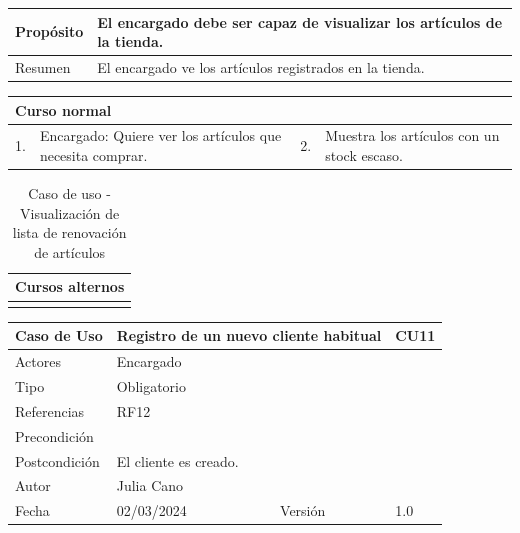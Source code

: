 \begin{table}[H]
	\centering
	\begin{tabular}{| m{} | m{} | m{} | m{} |}
		\hline
		Propósito & \multicolumn{3}{m{0.67\textwidth}|}{El encargado debe ser capaz de visualizar los artículos de la tienda.}  \\ 
		\hline
		Resumen & \multicolumn{3}{m{0.67\textwidth}|}{El encargado ve los artículos registrados en la tienda.} \\ 
		\hline
	\end{tabular}
\end{table}


\begin{table}[H]
	\centering
	\begin{tabular}{| m{} | m{} | m{} | m{} |}
		\hline
		\multicolumn{4}{|m{0.9\textwidth}|}{Curso normal}     \\ 
		\hline
		1. & Encargado: Quiere ver los artículos que necesita comprar. & 2. &  Muestra  los artículos con un stock escaso.  \\ 
		\hline
	\end{tabular}
\end{table}

\begin{table}[H]
	\centering
	\begin{tabular}{| m{} | m{} | m{} | m{} |}
		\hline
		\multicolumn{4}{|m{0.9\textwidth}|}{Cursos alternos}     \\ 
		\hline
		& \multicolumn{3}{m{0.67\textwidth}|}{} \\ 
		\hline
	\end{tabular}
	\caption{Caso de uso - Visualización de lista de renovación de artículos}
\end{table}

\newpage


\begin{table}[H]
	\centering
	\begin{tabular}{| m{} | m{} | m{} | m{}|}
		\hline
		\rowcolor{grayshade} Caso de Uso & \multicolumn{2}{|m{0.43\textwidth}|}{Registro de un nuevo cliente habitual} &  CU11\\ 
		\hline
		Actores & \multicolumn{3}{l|}{Encargado} \\ 
		\hline
		Tipo & \multicolumn{3}{l|}{Obligatorio} \\ 
		\hline
		Referencias & \multicolumn{3}{l|}{RF12} \\ 
		\hline
		Precondición & \multicolumn{3}{m{0.67\textwidth}|}{} \\ 
		\hline
		Postcondición & \multicolumn{3}{m{0.67\textwidth}|}{El cliente es creado.} \\ 
		\hline
		Autor & \multicolumn{3}{l|}{Julia Cano} \\ 
		\hline
		Fecha & 02/03/2024 & Versión & 1.0 \\
		\hline
	\end{tabular}
\end{table}

